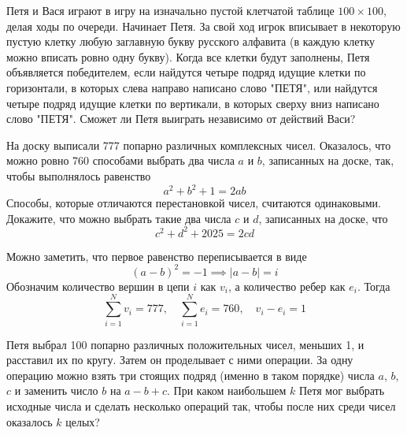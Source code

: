 \documentclass[11pt, a4paper]{problems_template}
\begin{document}
\begin{exercise}
Петя и Вася играют в игру на изначально пустой клетчатой таблице $100 \times 100$, делая ходы по очереди. Начинает Петя. За свой ход игрок вписывает в некоторую пустую клетку любую заглавную букву русского алфавита (в каждую клетку можно вписать ровно одну букву). Когда все клетки будут заполнены, Петя объявляется победителем, если найдутся четыре подряд идущие клетки по горизонтали, в
которых слева направо написано слово "ПЕТЯ", или найдутся четыре подряд идущие клетки по вертикали, в которых сверху вниз написано слово "ПЕТЯ". Сможет ли Петя
выиграть независимо от действий Васи?
\end{exercise}

\begin{exercise}
На доску выписали 777 попарно различных комплексных чисел. Оказалось, что можно ровно 760 способами выбрать два числа $a$ и $b$, записанных на доске, так, чтобы выполнялось равенство 
$$a^{2} + b^{2} + 1 = 2ab
$$
Способы, которые отличаются перестановкой чисел, считаются одинаковыми. Докажите, что можно выбрать такие
два числа $c$ и $d$, записанных на доске, что
$$
c^{2} + d^{2} + 2025 = 2cd
$$
\end{exercise}

\begin{Solution}
Можно заметить, что первое равенство переписывается в виде
$$
(a - b)^{2} = -1 \implies |a - b| = i
$$
Обозначим количество вершин в цепи $i$ как $v_{i}$, а количество ребер как $e_{i}$. Тогда
$$
\sum_{i = 1}^{N} v_{i} = 777, \quad \sum_{i = 1}^{N} e_{i} = 760, \quad v_{i} - e_{i} = 1
$$
\end{Solution}

\begin{exercise}
Петя выбрал 100 попарно различных положительных чисел, меньших 1, и расставил их по кругу. Затем он проделывает с ними операции. За одну операцию можно взять
три стоящих подряд (именно в таком порядке) числа $a$, $b$, $c$ и заменить число $b$ на $a - b + c$. При каком наибольшем $k$ Петя мог выбрать исходные числа и сделать несколько операций так, чтобы после них среди чисел оказалось $k$ целых?
\end{exercise}
\end{document}
